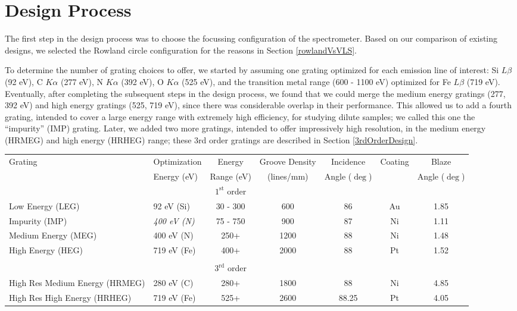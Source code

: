\section{Design Process}
The first step in the design process was to choose the focussing configuration of the spectrometer.  Based on our comparison of existing designs, we selected the Rowland circle configuration for the reasons in Section \ref{rowlandVsVLS}.

To determine the number of grating choices to offer, we started by assuming one grating optimized for each emission line of interest: Si $L\beta$ (92 eV), C $K\alpha$ (277 eV), N $K\alpha$ (392 eV), O $K\alpha$ (525 eV), and the transition metal range (600 - 1100 eV) optimized for Fe $L\beta$ (719 eV).  Eventually, after completing the subsequent steps in the design process, we found that we could merge the medium energy gratings (277, 392 eV) and high energy gratings (525, 719 eV), since there was considerable overlap in their performance.  This allowed us to add a fourth grating, intended to cover a large energy range with extremely high efficiency, for studying dilute samples; we called this one the ``impurity'' (IMP) grating.  Later, we added two more gratings, intended to offer impressively high resolution, in the medium energy (HRMEG) and high energy (HRHEG) range; these 3rd order gratings are described in Section \ref{3rdOrderDesign}.

\renewcommand{\arraystretch}{1.3}
\begin{table}[h]
   \centering
   {\scriptsize
 \begin{tabularx}{\textwidth}{@{} Xlccccc@{}} %
\toprule
        Grating    & Optimization& Energy& Groove Density & Incidence & Coating & Blaze\\
        & Energy (eV) & Range (eV) & (lines/mm) & Angle ($\deg$) & &Angle ($\deg$)\\
\toprule
      &&$1^\textrm{st}$ order&&&&\\
\midrule
Low Energy (LEG) & 92 eV (Si) & 30 - 300&600&86&Au&1.85\\
Impurity (IMP) & \emph{400 eV (N)} & 75 - 750&900&87&Ni&1.11\\
Medium Energy (MEG) & 400 eV (N) & 250+&1200&88&Ni&1.48\\
High Energy (HEG) & 719 eV (Fe) & 400+&2000&88&Pt&1.52\\
&&&&&&\\
\toprule
 & &$3^\textrm{rd}$ order&&&&\\
\midrule
High Res Medium Energy (HRMEG) & 280 eV (C) & 280+&1800&88&Ni&4.85\\
High Res High Energy (HRHEG) & 719 eV (Fe) & 525+&2600&88.25&Pt&4.05\\
\bottomrule
   \end{tabularx}
   }
   \label{gratings-table}
\end{table}
\renewcommand{\arraystretch}{1.2}

